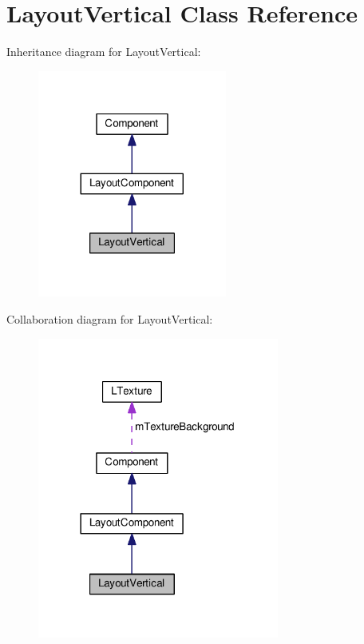 \hypertarget{class_layout_vertical}{}\section{Layout\+Vertical Class Reference}
\label{class_layout_vertical}


Inheritance diagram for Layout\+Vertical\+:\nopagebreak
\begin{figure}[H]
\begin{center}
\leavevmode
\includegraphics[width=176pt]{class_layout_vertical__inherit__graph}
\end{center}
\end{figure}


Collaboration diagram for Layout\+Vertical\+:\nopagebreak
\begin{figure}[H]
\begin{center}
\leavevmode
\includegraphics[width=225pt]{class_layout_vertical__coll__graph}
\end{center}
\end{figure}

